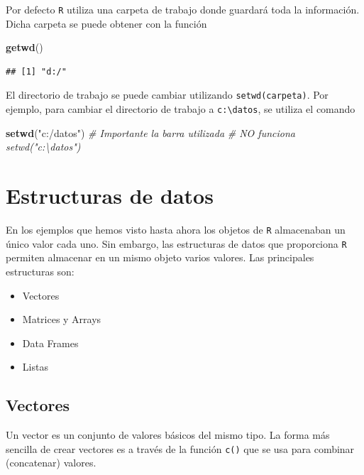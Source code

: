 \documentclass[]{book}
\newenvironment{Shaded}{\begin{snugshade}}{\end{snugshade}}
\newcommand{\KeywordTok}[1]{\textcolor[rgb]{0.13,0.29,0.53}{\textbf{#1}}}
\newcommand{\StringTok}[1]{\textcolor[rgb]{0.31,0.60,0.02}{#1}}
\newcommand{\CommentTok}[1]{\textcolor[rgb]{0.56,0.35,0.01}{\textit{#1}}}
\newcommand{\NormalTok}[1]{#1}
\begin{document}
Por defecto \texttt{R} utiliza una carpeta de trabajo donde guardará
toda la información. Dicha carpeta se puede obtener con la función

\begin{Shaded}
\begin{Highlighting}[]
\KeywordTok{getwd}\NormalTok{() }
\end{Highlighting}
\end{Shaded}

\begin{verbatim}
## [1] "d:/"
\end{verbatim}

El directorio de trabajo se puede cambiar utilizando
\texttt{setwd(carpeta)}. Por ejemplo, para cambiar el directorio de
trabajo a \texttt{c:\textbackslash{}datos}, se utiliza el comando

\begin{Shaded}
\begin{Highlighting}[]
\KeywordTok{setwd}\NormalTok{(}\StringTok{"c:/datos"}\NormalTok{)}
\CommentTok{# Importante la barra utilizada}
\CommentTok{# NO funciona setwd("c:\textbackslash{}datos")}
\end{Highlighting}
\end{Shaded}

\chapter{Estructuras de datos}\label{estructuras-de-datos}

En los ejemplos que hemos visto hasta ahora los objetos de \texttt{R}
almacenaban un único valor cada uno. Sin embargo, las estructuras de
datos que proporciona \texttt{R} permiten almacenar en un mismo objeto
varios valores. Las principales estructuras son:

\begin{itemize}
\item
  Vectores
\item
  Matrices y Arrays
\item
  Data Frames
\item
  Listas
\end{itemize}

\section{Vectores}\label{vectores}

Un vector es un conjunto de valores básicos del mismo tipo. La forma más
sencilla de crear vectores es a través de la función \texttt{c()} que se
usa para combinar (concatenar) valores.
\end{document}
